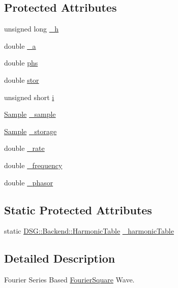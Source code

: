 \subsection*{Protected Attributes}
\begin{DoxyCompactItemize}
\item 
unsigned long \hyperlink{classDSG_1_1FourierSquare_a2b82df6091ad654fe59a44ff6e18a363}{\+\_\+h}
\item 
double \hyperlink{classDSG_1_1FourierSquare_afdbcae14dcc290e0074ba5c59acf1308}{\+\_\+a}
\item 
double \hyperlink{classDSG_1_1FourierSquare_a358692ef50a862ce5dc7d9d36de6df9f}{phs}
\item 
double \hyperlink{classDSG_1_1FourierSquare_acde3c734241151a4f2db200008dbc6d0}{stor}
\item 
unsigned short \hyperlink{classDSG_1_1FourierSquare_a4d191ba0c4aad4946cc60f90b7c48d88}{i}
\item 
\hyperlink{classDSG_1_1Sample}{Sample} \hyperlink{classDSG_1_1FourierGenerator_ab96bed1cd59c42e82a689036e5c62bef}{\+\_\+sample}
\item 
\hyperlink{classDSG_1_1Sample}{Sample} \hyperlink{classDSG_1_1FourierGenerator_a6b7f2439b26914cc9df6b6975a2cedac}{\+\_\+storage}
\item 
double \hyperlink{classDSG_1_1SignalGenerator_aa10f6c85d9adee901139ea7fb346f39d}{\+\_\+rate}
\item 
double \hyperlink{classDSG_1_1SignalGenerator_a67e296e3506dcdf09402c667cddff9ac}{\+\_\+frequency}
\item 
double \hyperlink{classDSG_1_1SignalGenerator_ac2271b582bf699275f077ecb642a8cd9}{\+\_\+phasor}
\end{DoxyCompactItemize}
\subsection*{Static Protected Attributes}
\begin{DoxyCompactItemize}
\item 
static \hyperlink{classDSG_1_1Backend_1_1HarmonicTable}{D\+S\+G\+::\+Backend\+::\+Harmonic\+Table} \hyperlink{classDSG_1_1FourierGenerator_aedac2cf90997418836d064c90540249d}{\+\_\+harmonic\+Table}
\end{DoxyCompactItemize}


\subsection{Detailed Description}
Fourier Series Based \hyperlink{classDSG_1_1FourierSquare}{Fourier\+Square} Wave. 

